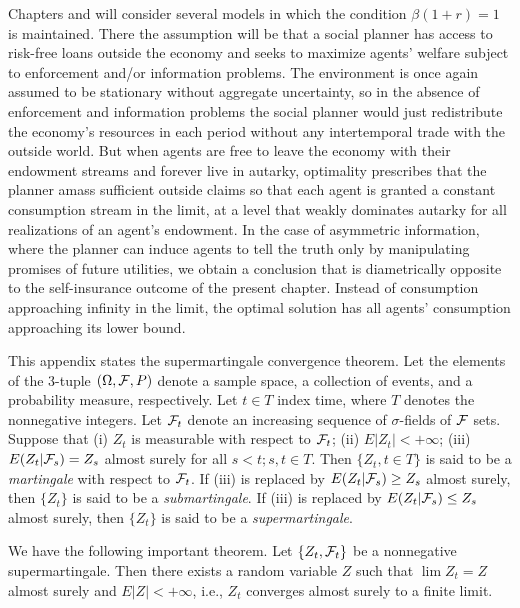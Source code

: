 Chapters  and  will consider several models in
which the condition $\beta (1+r)=1$ is maintained. There the assumption
will be that a social planner has access to risk-free loans outside
the economy and seeks to maximize agents' welfare subject to enforcement
and/or information problems.  The environment is once again assumed to be
stationary without aggregate uncertainty, so in the absence of enforcement
and information problems the social planner would just redistribute the
economy's resources in each period without any intertemporal trade
with the outside world.  But when agents are free to leave the economy
with their endowment streams and forever live in autarky, optimality
 prescribes that the  planner amass sufficient outside claims
so that each agent is granted a constant consumption stream in the limit, at
a level that weakly dominates autarky for all realizations of an agent's
endowment.  In the case of asymmetric information,  where the  planner
can  induce agents to tell the truth only by manipulating promises of future
utilities, we obtain a conclusion that is diametrically opposite to the
self-insurance outcome of the present chapter.  Instead of consumption
approaching infinity in the limit, the optimal solution has all agents'
consumption approaching its lower bound.

\label{app:Ach16}%
This appendix states the supermartingale convergence theorem.
Let the elements of the 3-tuple
$(\Omega,  {\cal F}, P)$ denote a sample space, a collection
of events, and a probability measure, respectively.
Let $t \in T$ index time, where $T$ denotes the nonnegative
integers.
Let ${\cal F}_t$ denote an increasing sequence of $\sigma$-fields
of ${\cal F}$ sets.
Suppose that
\medskip
\noindent(i)  $Z_t$ is measurable with respect to ${\cal F}_t$;
\medskip
\noindent(ii)  $E | Z_t   | < + \infty $;
\medskip
\noindent(iii) $ E(Z_t | {\cal F}_s) = Z_s$ almost surely for
all $s < t; s, t \in T$.
\medskip
\noindent Then $\{Z_t, t \in T\}$ is said to be a {\it martingale\/} with
respect to ${\cal F}_t$.
 If (iii) is replaced by
$E(Z_t | {\cal F}_s ) \geq Z_s$ almost surely, then
$\{Z_t\}$ is said to be a {\it submartingale\/}.
 If (iii) is replaced by
$E(Z_t | {\cal F}_s ) \leq Z_s$ almost surely, then
$\{Z_t\}$ is said to be a {\it supermartingale\/}.

\medskip
We have the following important theorem.
\medskip
{}  Let
$\{Z_t,   {\cal F}_t\}$ be a nonnegative supermartingale.
Then there exists a random variable
$Z$ such that $\lim Z_t = Z$ almost surely and
$E |Z| < + \infty$, i.e., $Z_t$ converges almost surely
to a finite limit.




